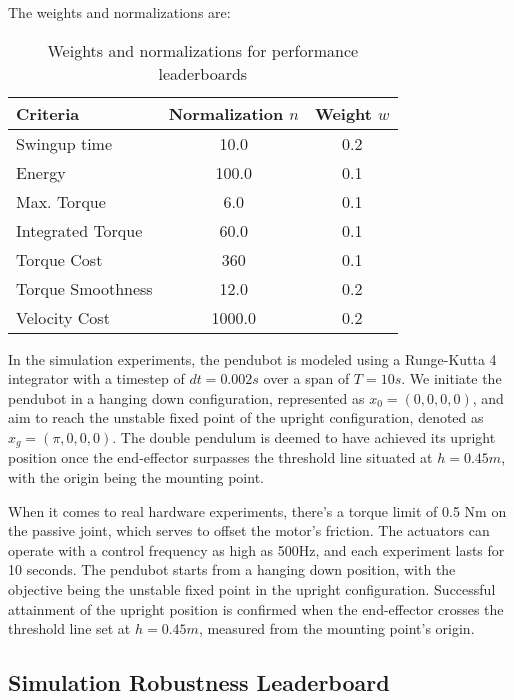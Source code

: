 The weights and normalizations are:
\begin{table}[H]
  \centering
  \begin{tabular}{lcc}
    \hline
    Criteria & Normalization \(\mathit{n}\) & Weight \(\mathit{w}\) \\
    \hline
    Swingup time & 10.0 & 0.2 \\
    Energy & 100.0 & 0.1 \\
    Max. Torque & 6.0 & 0.1 \\
    Integrated Torque & 60.0 & 0.1 \\
    Torque Cost & 360 & 0.1 \\
    Torque Smoothness & 12.0 & 0.2 \\
    Velocity Cost & 1000.0 & 0.2 \\
    \hline
  \end{tabular}
  \caption{Weights and normalizations for performance leaderboards}
  \label{tab:performance}
\end{table}

In the simulation experiments, the pendubot is modeled using a Runge-Kutta 4 integrator with a timestep of \(dt=0.002s\) over a span of \(T=10s\). We initiate the pendubot in a hanging down configuration, represented as \(x_0 = (0, 0, 0, 0)\), and aim to reach the unstable fixed point of the upright configuration, denoted as \(x_g = (\pi, 0, 0, 0)\). The double pendulum is deemed to have achieved its upright position once the end-effector surpasses the threshold line situated at \(h=0.45m\), with the origin being the mounting point.

When it comes to real hardware experiments, there's a torque limit of 0.5 Nm on the passive joint, which serves to offset the motor's friction. The actuators can operate with a control frequency as high as 500Hz, and each experiment lasts for 10 seconds. The pendubot starts from a hanging down position, with the objective being the unstable fixed point in the upright configuration. Successful attainment of the upright position is confirmed when the end-effector crosses the threshold line set at \(h=0.45m\), measured from the mounting point's origin.

\subsection{Simulation Robustness Leaderboard}

